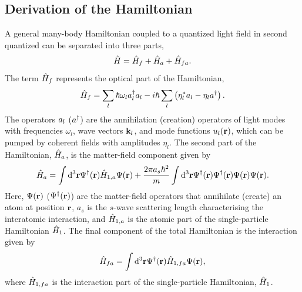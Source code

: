 \subsection{Derivation of the Hamiltonian}
\label{sec:derivation}

A general many-body Hamiltonian coupled to a quantized light field in
second quantized can be separated into three parts,
\begin{equation}
\label{eq:FullH}
  \hat{H} = \hat{H}_f + \hat{H}_a + \hat{H}_{fa}.
\end{equation}
The term $\hat{H}_f$ represents the optical part of the Hamiltonian,
\begin{equation}
\label{eq:Hf}
  \hat{H}_f = \sum_l \hbar \omega_l a^\dagger_l a_l -
  i \hbar \sum_l \left( \eta_l^* a_l - \eta_l a^\dagger \right).
\end{equation}
The operators $a_l$ ($a^\dagger$) are the annihilation (creation) operators
of light modes with frequencies $\omega_l$, wave vectors $\mathbf{k}_l$,
and mode functions $u_l(\mathbf{r})$, which can be pumped by coherent
fields with amplitudes $\eta_l$. The second part of the Hamiltonian,
$\hat{H}_a$, is the matter-field component given by
\begin{equation}
\label{eq:Ha}
  \hat{H}_a = \int \mathrm{d}^3 \mathbf{r} \Psi^\dagger(\mathbf{r}) \hat{H}_{1,a}
  \Psi(\mathbf{r}) + \frac{2 \pi a_s \hbar^2}{m} \int \mathrm{d}^3 \mathbf{r}
  \Psi^\dagger(\mathbf{r}) \Psi^\dagger(\mathbf{r}) \Psi(\mathbf{r}) \Psi(\mathbf{r}).
\end{equation}
Here, $\Psi(\mathbf{r})$ ($\Psi^\dagger(\mathbf{r})$) are the matter-field
operators that annihilate (create) an atom at position $\mathbf{r}$, $a_s$
is the $s$-wave scattering length characterising the interatomic
interaction, and $\hat{H}_{1,a}$ is the atomic part of the single-particle
Hamiltonian $\hat{H}_1$. The final component of the total Hamiltonian is
the interaction given by 
\begin{equation}
  \label{eq:Hfa}
  \hat{H}_{fa} = \int \mathrm{d}^3 \mathbf{r} \Psi^\dagger(\mathbf{r}) \hat{H}_{1,fa}
  \Psi(\mathbf{r}),
\end{equation}
where $\hat{H}_{1,fa}$ is the interaction part of the single-particle
Hamiltonian, $\hat{H}_1$.

